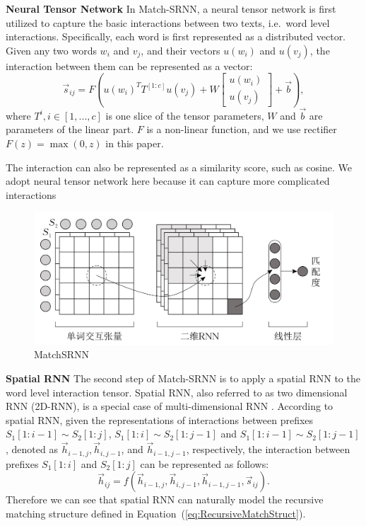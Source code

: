 \textbf{Neural Tensor Network}
In Match-SRNN, a neural tensor network is first utilized to capture the basic interactions between two texts, i.e.~word level interactions.
Specifically, each word is first represented as a distributed vector. Given any two words $w_i$ and $v_j$, and their vectors $u(w_i)$ and $u(v_j)$, the interaction between them can be represented as a vector:
\begin{equation*}
\vec{s}_{ij}=F(u(w_i)^TT^{[1:c]}u(v_j)+W\begin{bmatrix}
		u(w_i)\\
		u(v_j)
	\end{bmatrix}+\vec{b}),
\end{equation*}
where $T^i, i\in[1,...,c]$ is one slice of the tensor parameters, $W$ and $\vec{b}$ are parameters of the linear part. $F$ is a non-linear function, and we use rectifier $F(z)=\max(0,z)$ in this paper.

The interaction can also be represented as a similarity score, such as cosine. We adopt neural tensor network here because it can capture more complicated interactions 

\begin{figure}[!htbp]
\vspace{1em}
\centering
  \includegraphics[width=0.9\linewidth]{figures/MatchSRNN.jpg}
  \caption{MatchSRNN}
  \label{fig:architecture}       %
\vspace{1em}
\end{figure}



\textbf{Spatial RNN}
The second step of Match-SRNN is to apply a spatial RNN to the word level interaction tensor. Spatial RNN, also referred to as two dimensional RNN (2D-RNN), is a special case of multi-dimensional RNN \cite{DBLP:journals/corr/abs-0705-2011,graves2009offline,theis2015generative}. According to spatial RNN, given the representations of interactions between prefixes $S_1[1{:}i{-}1]\!{\sim}\! S_2[1{:}j]$, $S_1[1{:}i]\!{\sim}\! S_2[1{:}j{-}1]$ and $S_1[1{:}i{-}1]\!{\sim}\! S_2[1{:}j{-}1]$, denoted as $\vec{h}_{i-1,j},\vec{h}_{i,j-1}$, and $\vec{h}_{i-1,j-1}$, respectively, the interaction between prefixes $S_1[1{:}i]$ and $S_2[1{:}j]$ can be represented as follows:
\begin{equation}
\vec{h}_{ij}=f(\vec{h}_{i-1,j},\vec{h}_{i,j-1},\vec{h}_{i-1,j-1},\vec{s}_{ij}).
\end{equation}
Therefore we can see that spatial RNN can naturally model the recursive matching structure defined in Equation~(\ref{eq:RecursiveMatchStruct}).

